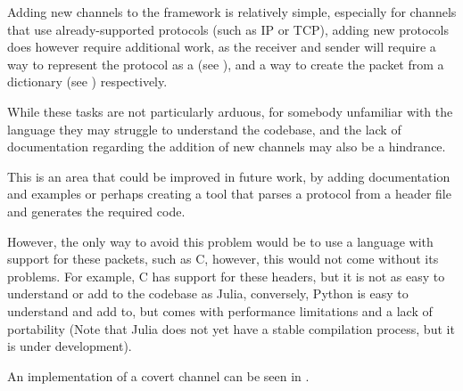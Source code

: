 Adding new channels to the framework is relatively simple, especially for channels that use already-supported protocols (such as IP or TCP), adding new protocols does however require additional work, as the receiver and sender will require a way to represent the protocol as a  (see ), and a way to create the packet from a dictionary (see ) respectively.

While these tasks are not particularly arduous, for somebody unfamiliar with the language they may struggle to understand the codebase, and the lack of documentation regarding the addition of new channels may also be a hindrance.

This is an area that could be improved in future work, by adding documentation and examples or perhaps creating a tool that parses a protocol from a header file and generates the required code.

However, the only way to avoid this problem would be to use a language with support for these packets, such as C, however, this would not come without its problems. For example, C has support for these headers, but it is not as easy to understand or add to the codebase as Julia, conversely, Python is easy to understand and add to, but comes with performance limitations and a lack of portability (Note that Julia does not yet have a stable compilation process, but it is under development).

An implementation of a covert channel can be seen in .